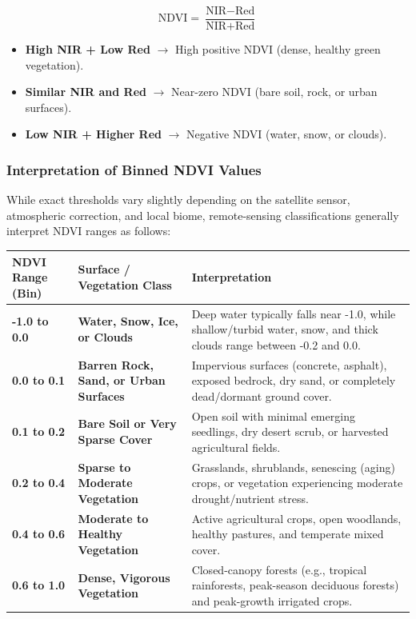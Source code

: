 \documentclass[12pt, letterpaper]{article}
\begin{document}
\[
\text{NDVI} = \frac{\text{NIR} - \text{Red}}{\text{NIR} + \text{Red}}
\]

\begin{itemize}
    \item \textbf{High NIR + Low Red} $\rightarrow$ High positive NDVI (dense, healthy green vegetation).
    \item \textbf{Similar NIR and Red} $\rightarrow$ Near-zero NDVI (bare soil, rock, or urban surfaces).
    \item \textbf{Low NIR + Higher Red} $\rightarrow$ Negative NDVI (water, snow, or clouds).
\end{itemize}

\subsubsection*{Interpretation of Binned NDVI Values}
While exact thresholds vary slightly depending on the satellite sensor, atmospheric correction, and local biome, remote-sensing classifications generally interpret NDVI ranges as follows:

\begin{table}[H]
\centering
\renewcommand{\arraystretch}{1.35}
\begin{tabularx}{\textwidth}{@{} l l X @{}}
\toprule
\textbf{NDVI Range (Bin)} & \textbf{Surface / Vegetation Class} & \textbf{Interpretation} \\
\midrule
\textbf{-1.0 to 0.0} & \textbf{Water, Snow, Ice, or Clouds} & Deep water typically falls near -1.0, while shallow/turbid water, snow, and thick clouds range between -0.2 and 0.0. \\
\textbf{0.0 to 0.1} & \textbf{Barren Rock, Sand, or Urban Surfaces} & Impervious surfaces (concrete, asphalt), exposed bedrock, dry sand, or completely dead/dormant ground cover. \\
\textbf{0.1 to 0.2} & \textbf{Bare Soil or Very Sparse Cover} & Open soil with minimal emerging seedlings, dry desert scrub, or harvested agricultural fields. \\
\textbf{0.2 to 0.4} & \textbf{Sparse to Moderate Vegetation} & Grasslands, shrublands, senescing (aging) crops, or vegetation experiencing moderate drought/nutrient stress. \\
\textbf{0.4 to 0.6} & \textbf{Moderate to Healthy Vegetation} & Active agricultural crops, open woodlands, healthy pastures, and temperate mixed cover. \\
\textbf{0.6 to 1.0} & \textbf{Dense, Vigorous Vegetation} & Closed-canopy forests (e.g., tropical rainforests, peak-season deciduous forests) and peak-growth irrigated crops. \\
\bottomrule
\end{tabularx}
\end{table}
\end{document}
